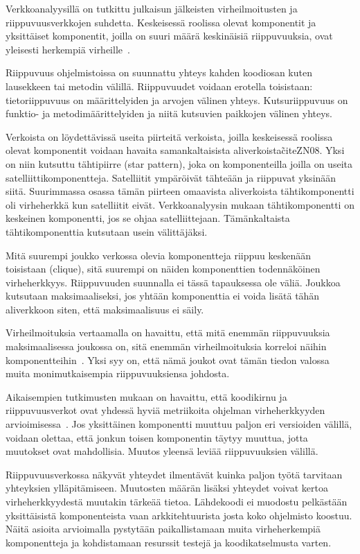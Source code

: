 \documentclass[finnish]{../tktltiki2}
\theoremstyle{definition}
\theoremstyle{remark}
\begin{document}
    Verkkoanalyysillä on tutkittu julkaisun jälkeisten virheilmoitusten ja riippuvuusverkkojen suhdetta. Keskeisessä 
roolissa olevat komponentit ja yksittäiset komponentit, joilla on suuri määrä keskinäisiä riippuvuuksia, ovat 
yleisesti herkempiä virheille~\cite{ZN08}.

    Riippuvuus ohjelmistoissa on suunnattu yhteys kahden koodiosan kuten lausekkeen tai metodin välillä. Riippuvuudet 
voidaan erotella toisistaan: tietoriippuvuus on määrittelyiden ja arvojen välinen yhteys. Kutsuriippuvuus on funktio- ja 
metodimäärittelyiden ja niitä kutsuvien paikkojen välinen yhteys.

    Verkoista on löydettävissä useita piirteitä verkoista, joilla keskeisessä roolissa olevat komponentit voidaan 
havaita samankaltaisista aliverkoista\~cite{ZN08}. Yksi on niin kutsuttu tähtipiirre (star pattern), joka on 
komponenteilla joilla on useita satelliittikomponentteja. Satelliitit ympäröivät tähteään ja riippuvat yksinään siitä. 
Suurimmassa osassa tämän piirteen omaavista aliverkoista tähtikomponentti oli virheherkkä kun satelliitit eivät. 
Verkkoanalyysin mukaan tähtikomponentti on keskeinen komponentti, jos se ohjaa satelliittejaan. Tämänkaltaista 
tähtikomponenttia kutsutaan usein välittäjäksi.

    Mitä suurempi joukko verkossa olevia komponentteja riippuu keskenään toisistaan (clique), sitä suurempi on näiden 
komponenttien todennäköinen virheherkkyys. Riippuvuuden suunnalla ei tässä tapauksessa ole väliä. Joukkoa kutsutaan 
maksimaaliseksi, jos yhtään komponenttia ei voida lisätä tähän aliverkkoon siten, että maksimaalisuus ei säily.

    Virheilmoituksia vertaamalla on havaittu, että mitä enemmän riippuvuuksia maksimaalisessa joukossa on, sitä enemmän 
virheilmoituksia korreloi näihin komponentteihin~\cite{ZN08}. Yksi syy on, että nämä joukot ovat tämän tiedon valossa 
muita monimutkaisempia riippuvuuksiensa johdosta.

    Aikaisempien tutkimusten mukaan on havaittu, että koodikirnu ja riippuvuusverkot ovat yhdessä hyviä metriikoita 
ohjelman virheherkkyyden arvioimisessa~\cite{NB07}. Jos yksittäinen komponentti muuttuu paljon eri versioiden välillä, 
voidaan olettaa, että jonkun toisen komponentin täytyy muuttua, jotta muutokset ovat mahdollisia. Muutos yleensä leviää 
riippuvuuksien välillä.

    Riippuvuusverkossa näkyvät yhteydet ilmentävät kuinka paljon työtä tarvitaan yhteyksien ylläpitämiseen. Muutosten 
määrän lisäksi yhteydet voivat kertoa virheherkkyydestä muutakin tärkeää tietoa. Lähdekoodi ei muodostu pelkästään 
yksittäisistä komponenteista vaan arkkitehtuurista josta koko ohjelmisto koostuu. Näitä asioita arvioimalla pystytään 
paikallistamaan muita virheherkempiä komponentteja ja kohdistamaan resurssit testejä ja koodikatselmusta varten.
\end{document}
